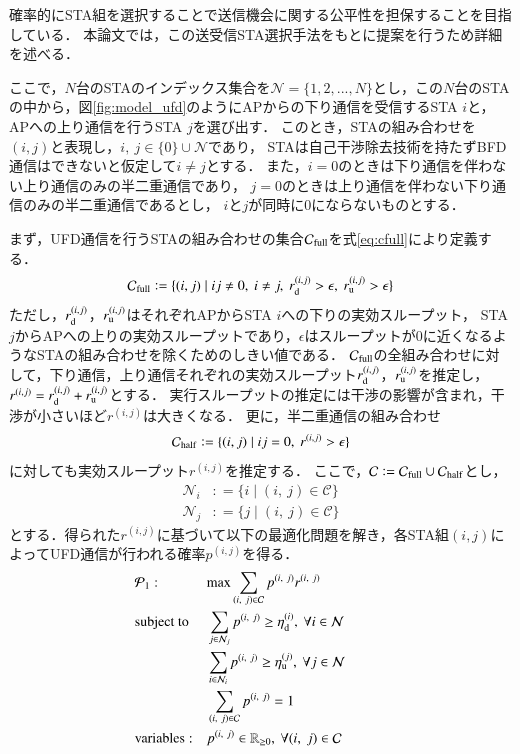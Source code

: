 \documentclass[master]{kuisthesis}		%
\newcommand{\sij}{(i,j)}
\newcommand{\mN}{{\mathcal N}}
\newcommand{\pij}{p^{(i,j)}}
\newcommand{\rd}{r^{\sij}_{\rm d}}
\newcommand{\ru}{r^{\sij}_{\rm u}}
\newcommand{\rij}{r^{\sij}}
\def\equiv{\mathrel{\mathop:}=}
\begin{document}
			確率的にSTA組を選択することで送信機会に関する公平性を担保することを目指している．
			本論文では，この送受信STA選択手法をもとに提案を行うため詳細を述べる．
			\par
			ここで，$N$台のSTAのインデックス集合を$\mN=\{1,2,...,N\}$とし，この$N$台のSTAの中から，図\ref{fig:model_ufd}のようにAPからの下り通信を受信するSTA $i$と，APへの上り通信を行うSTA $j$を選び出す．
			このとき，STAの組み合わせを$\sij$と表現し，$i,\ j \in \{0\}\cup \mN$であり，
			STAは自己干渉除去技術を持たずBFD通信はできないと仮定して$i\neq j$とする．
			また，$i=0$のときは下り通信を伴わない上り通信のみの半二重通信であり，
			$j=0$のときは上り通信を伴わない下り通信のみの半二重通信であるとし，
			$i$と$j$が同時に0にならないものとする．
			\par
			まず，UFD通信を行うSTAの組み合わせの集合${\mathcal C}_{\rm full}$を式\eqref{eq:cfull}により定義する．
			\begin{equation}
				{\mathcal C}_{\rm full} \equiv \{\sij\mid ij\neq0,\ i\neq j,\ r^{\sij}_{\rm d}>\epsilon,\ r^{\sij}_{\rm u}>\epsilon\} \label{eq:cfull}
			\end{equation}
			ただし，$r_{\rm d}^{\sij}$，$r_{\rm u}^{\sij}$はそれぞれAPからSTA $i$への下りの実効スループット，
			STA $j$からAPへの上りの実効スループットであり，$\epsilon$はスループットが0に近くなるようなSTAの組み合わせを除くためのしきい値である．
			${\mathcal C}_{\rm full}$の全組み合わせに対して，下り通信，上り通信それぞれの実効スループット$\rd$，$\ru$を推定し，$\rij=\rd + \ru$とする．
			実行スループットの推定には干渉の影響が含まれ，干渉が小さいほど$\rij$は大きくなる．
			更に，半二重通信の組み合わせ
			\begin{equation}
				{\mathcal C}_{\rm half} \equiv \{\sij\mid ij=0,\ \rij >\epsilon\}
			\end{equation}
			に対しても実効スループット$\rij$を推定する．
			ここで，${\mathcal C} \equiv {\mathcal C}_{\rm full} \cup {\mathcal C}_{\rm half}$とし，
			\begin{align}
				{\mathcal N}_i &\equiv \{i\mid(i,\ j)\in{\mathcal C}\}\\
				{\mathcal N}_j &\equiv \{j\mid(i,\ j)\in{\mathcal C}\}
			\end{align}
			とする．得られた$\rij$に基づいて以下の最適化問題を解き，各STA組$\sij$によってUFD通信が行われる確率$\pij$を得る．
			\begin{align}
				&{\mathcal P}_1: && {\rm max} \sum_{(i,\ j)\in{\mathcal C}} p^{(i,\ j)}r^{(i,\ j)} &&&&&& \label{eq:p1}\\
				&{\rm subject\ to} && \sum_{j\in{\mathcal N}_j} p^{(i,\ j)} \geq \eta_{\rm d}^{(i)},\ \forall i\in {\mathcal N} \label{eq:pd} \\
				&&& \sum_{i\in{\mathcal N}_i} p^{(i,\ j)} \geq \eta_{\rm u}^{(j)},\ \forall j\in {\mathcal N} \label{eq:pu}\\
				&&& \sum_{(i,\ j)\in{\mathcal C}} p^{(i,\ j)}=1 \\
				&{\rm variables:} &&p^{(i,\ j)} \in {\mathbb R}_{\geq 0},\ \forall(i,\ j)\in {\mathcal C} \nonumber
			\end{align}
\end{document}
